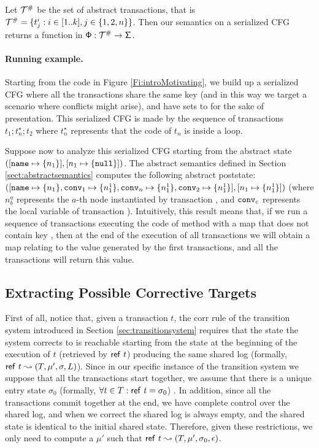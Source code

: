 Let $\abstracttransactions$ be the set of abstract transactions, that is $\abstracttransactions = \{t^i_j : i \in [1..k], j \in \{1, 2, n\}\}$. Then our semantics on a serialized CFG returns a function in $\amultistate : \abstracttransactions \to \astate$.


\paragraph{Running example.}
Starting from the code in Figure \ref{Fi:introMotivating}, we build up a serialized CFG where all the transactions share the same key  (and in this way we target a scenario where conflicts might arise), and have  sets to  for the sake of presentation. This serialized CFG is made by the sequence of transactions $t_1; t_n^\star; t_2$ where $t_n^\star$ represents that the code of $t_n$ is inside a loop.

Suppose now to analyze this serialized CFG starting from the abstract state $([\mathtt{name} \mapsto \{n_1\}], [n_1 \mapsto \{\mathtt{null}\}])$. The abstract semantics defined in Section \ref{sect:abstractsemantics} computes the following abstract poststate: $([\mathtt{name} \mapsto \{n_1\}, \mathtt{conv}_1 \mapsto \{n^1_1\}, \mathtt{conv}_n \mapsto \{n^1_1\}, \mathtt{conv}_2 \mapsto \{n^1_1\}], [n_1 \mapsto \{n^1_1\}])$ (where $n^a_b$ represents the $a$-th node instantiated by transaction , and $\mathtt{conv}_c$ represents the local variable  of transaction ). Intuitively, this result means that, if we run a sequence of transactions executing the code of method  with a map that does not contain key , then at the end of the execution of all transactions we will obtain a map relating  to the value generated by the first transactions, and all the transactions will return this value.

\subsection{Extracting Possible Corrective Targets}
First of all, notice that, given a transaction $t$, the {\sf corr} rule of the transition system introduced in Section \ref{sec:transitionsystem} requires that the state the system corrects to is reachable starting from the state at the beginning of the execution of $t$ (retrieved by ${\sf ref}\ t$) producing the same shared log (formally, ${\sf ref}\ t \leadsto (T,\mu', \sigma, L)$). Since in our specific instance of the transition system we suppose that all the transactions start together, we assume that there is a unique entry state $\sigma_0$ (formally, $\forall t \in T : {\sf ref}\ t=\sigma_0$) . In addition, since all the transactions commit together at the end, we have complete control over the shared log, and when we correct the shared log is always empty, and the shared state is identical to the initial shared state. Therefore, given these restrictions, we only need to compute a $\mu'$ such that ${\sf ref}\ t \leadsto (T,\mu', \sigma_0, \epsilon)$.

